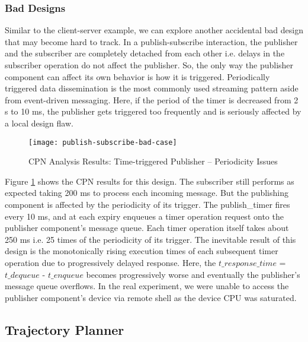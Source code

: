 \subsubsection{Bad Designs}

Similar to the client-server example, we can explore another accidental bad design that may become hard to track. In a publish-subscribe interaction, the publisher and the subscriber are completely detached from each other i.e. delays in the subscriber operation do not affect the publisher. So, the only way the publisher component can affect its own behavior is how it is triggered. Periodically triggered data dissemination is the most commonly used streaming pattern aside from event-driven messaging. Here, if the period of the timer is decreased from 2 s to 10 ms, the publisher gets triggered too frequently and is seriously affected by a local design flaw.  

\begin{figure}[h]
	\centering
	\texttt{[image: publish-subscribe-bad-case]}
	\caption{CPN Analysis Results: Time-triggered Publisher -- Periodicity Issues}
	\label{fig:publish-subscribe-bad-case}
\end{figure}
\FloatBarrier

Figure \ref{fig:publish-subscribe-bad-case} shows the CPN results for this design. The subscriber still performs as expected taking 200 ms to process each incoming message. But the publishing component is affected by the periodicity of its trigger. The publish\_timer fires every 10 ms, and at each expiry enqueues a timer operation request onto the publisher component's message queue. Each timer operation itself takes about 250 ms i.e. 25 times of the periodicity of its trigger. The inevitable result of this design is the monotonically rising execution times of each subsequent timer operation due to progressively delayed response. Here, the $t\_response\_time$ = $t\_dequeue$ - $t\_enqueue$ becomes progressively worse and eventually the publisher's message queue overflows. In the real experiment, we were unable to access the publisher component's device via remote shell as the device CPU was saturated. 

\subsection{Trajectory Planner}

